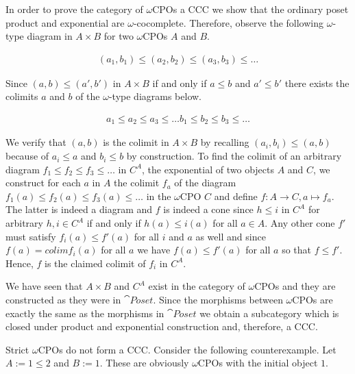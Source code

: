 
In order to prove the category of $ω$CPOs a CCC we show that the ordinary poset product and exponential are $ω$-cocomplete. Therefore, observe the following $ω$-type diagram in $A × B$ for two $ω$CPOs $A$ and $B$.

\begin{align}
	(a_1,b_1) ≤ (a_2,b_2) ≤ (a_3,b_3) ≤ …
\end{align}

Since $(a,b) ≤ (a',b')$ in $A × B$ if and only if $a ≤ b$ and $a' ≤ b'$ there exists the colimits $a$ and $b$ of the $ω$-type diagrams below.

\begin{align}
	a_1 ≤ a_2 ≤ a_3 ≤ …
	b_1 ≤ b_2 ≤ b_3 ≤ …
\end{align}

We verify that $(a,b)$ is the colimit in $A × B$ by recalling $(a_i,b_i) ≤ (a,b)$ because of $a_i ≤ a$ and $b_i ≤ b$ by construction. To find the colimit of an arbitrary diagram $f_1 ≤ f_2 ≤ f_3 ≤ …$ in $C^A$, the exponential of two objects $A$ and $C$, we construct for each $a$ in $A$ the colimit $f_a$ of the diagram $f_1(a) ≤ f_2(a) ≤ f_3(a) ≤ …$ in the $ω$CPO $C$ and define $f : A → C, a ↦ f_a$. The latter is indeed a diagram and $f$ is indeed a cone since $h ≤ i$ in $C^A$ for arbitrary $h, i ∈ C^A$ if and only if $h(a) ≤ i(a)$ for all $a ∈ A$. Any other cone $f'$ must satisfy $f_i(a) ≤ f'(a)$ for all $i$ and $a$ as well and since $f(a) = colim f_i(a)$ for all $a$ we have $f(a) ≤ f'(a)$ for all $a$ so that $f ≤ f'$. Hence, $f$ is the claimed colimit of $f_i$ in $C^A$.

We have seen that $A × B$ and $C^A$ exist in the category of $ω$CPOs and they are constructed as they were in $\cat{Poset}$. Since the morphisms between $ω$CPOs are exactly the same as the morphisms in $\cat{Poset}$ we obtain a subcategory which is closed under product and exponential construction and, therefore, a CCC.

Strict $ω$CPOs do not form a CCC. Consider the following counterexample. Let $A := 1 ≤ 2$ and $B := 1$. These are obviously $ω$CPOs with the initial object $1$.


